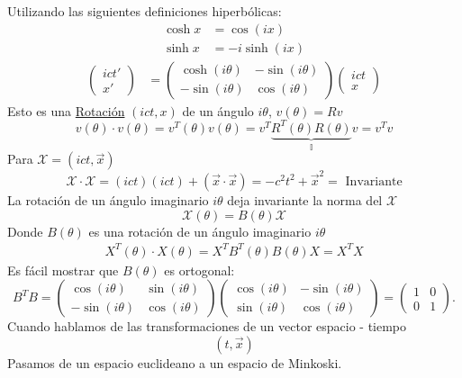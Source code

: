 \documentclass[a4paper,12pt]{article}
\begin{document}
Utilizando las siguientes definiciones hiperbólicas: 
\begin{align*}
    \cosh x &= \cos(ix)\\
    \sinh x &= -i \sinh(ix)
\end{align*}
\begin{align*}
    \begin{pmatrix} ict' \\x'\end{pmatrix} &= \begin{pmatrix}    \cosh (i\theta) &-\sin  (i\theta) \\ - \sin (i\theta) & \cos (i\theta) 
\end{pmatrix} \begin{pmatrix}
    ict \\x
\end{pmatrix}
\end{align*}
Esto es una \underline{Rotación} $(ict,x)$ de un ángulo $i\theta$, $v(\theta ) = Rv$ 
\[
v(\theta )\cdot v(\theta )  = v^T(\theta ) v(\theta ) = v^T \underbrace{ R^T (\theta)R(\theta)  }_{\mathbb{I} }  v = v^Tv
\]
Para $\mathcal{X} = (ict, \Vec{x})$
\[
\mathcal{X}\cdot\mathcal{X} = (ict ) (ict) + (\Vec{x}\cdot \Vec{x})  = -c^2t^2+ \Vec{x}^2 = \text{ Invariante} 
\]
La rotación de un ángulo imaginario $i \theta $ deja invariante la norma del  $\mathcal{X}$ 
\[
\mathcal{X} (\theta )= B (\theta ) \mathcal{ X } 
\]
 Donde  $B (\theta )$ es una rotación de un ángulo imaginario $i \theta $
\begin{align*}
    X^T (\theta ) \cdot X(\theta)  = X^T B^T (\theta ) B(\theta ) X = X^T X 
\end{align*}
Es fácil mostrar que $B(\theta )$ es ortogonal: 
\[
B^TB = \begin{pmatrix}
    \cos(i \theta) &  \sin(i \theta) \\ - \sin(i \theta) & \cos(i \theta)\end{pmatrix} \begin{pmatrix}
    \cos(i \theta) &  -\sin(i \theta) \\  \sin(i \theta) & \cos(i \theta)\end{pmatrix}   = \begin{pmatrix}
        1&0\\0&1
    \end{pmatrix}.
\]
Cuando hablamos de las transformaciones de un vector espacio - tiempo 
\[
(t, \Vec{x})
\]
Pasamos de un espacio euclideano a un espacio de Minkoski. 
\end{document}
